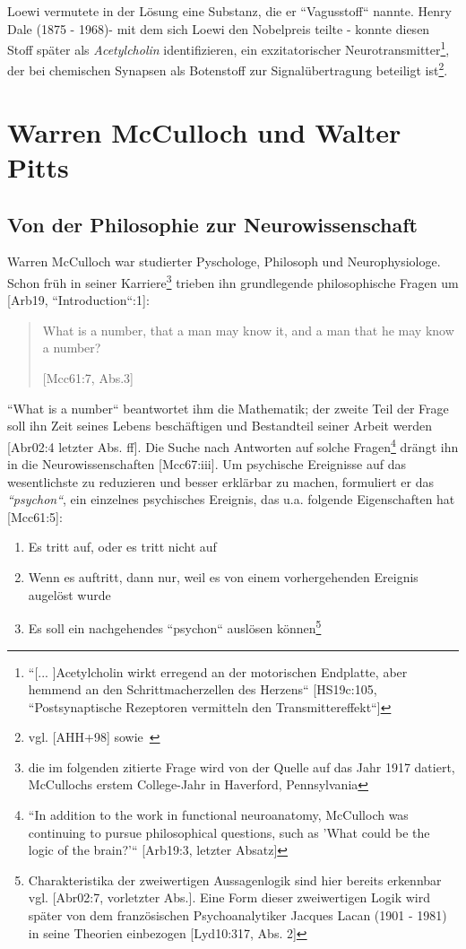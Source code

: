 Loewi vermutete in der Lösung eine Substanz, die er ``Vagusstoff`` nannte.
Henry Dale (1875 - 1968)- mit dem sich Loewi den Nobelpreis teilte - konnte diesen Stoff später als \textit{Acetylcholin} identifizieren, ein exzitatorischer Neurotransmitter\footnote{
    ``[... ]Acetylcholin wirkt erregend an der motorischen Endplatte, aber hemmend an den Schrittmacherzellen des Herzens`` {[HS19c:105, ``Postsynaptische Rezeptoren vermitteln den Transmittereffekt``]}
}, der bei chemischen Synapsen als Botenstoff zur Signalübertragung beteiligt ist\footnote{
    vgl. {[AHH+98]} sowie~\cite[119, Exkurs 5.1]{BCP18}
}.

\section{Warren McCulloch und Walter Pitts}\label{appendix:mcculloch}
\subsection*{Von der Philosophie zur Neurowissenschaft}

Warren McCulloch war studierter Pyschologe, Philosoph und Neurophysiologe.
Schon früh in seiner Karriere\footnote{
    die im folgenden zitierte Frage wird von der Quelle auf das Jahr 1917 datiert, McCullochs erstem College-Jahr in Haverford, Pennsylvania
} trieben ihn grundlegende philosophische Fragen um [Arb19, ``Introduction``:1]:

\blockquote[{[Mcc61:7, Abs.3]}]{
    What is a number, that a man may know it, and a man that he may know a number{?}
}

\noindent
``What is a number`` beantwortet ihm die Mathematik; der zweite Teil der Frage soll ihn Zeit seines Lebens beschäftigen und Bestandteil seiner Arbeit werden [Abr02:4 letzter Abs. ff].
Die Suche nach Antworten auf solche Fragen\footnote{
    ``In addition to the work in functional neuroanatomy, McCulloch was continuing to pursue philosophical questions, such as 'What could be the logic of the brain?'`` [Arb19:3, letzter Absatz]
} drängt ihn in die Neurowissenschaften [Mcc67:iii].
Um psychische Ereignisse auf das wesentlichste zu reduzieren und besser erklärbar zu machen, formuliert er das \textit{``psychon``}, ein einzelnes psychisches Ereignis, das u.a. folgende Eigenschaften hat [Mcc61:5]:

\begin{enumerate}
    \item Es tritt auf, oder es tritt nicht auf
    \item Wenn es auftritt, dann nur, weil es von einem vorhergehenden Ereignis augelöst wurde
    \item Es soll ein nachgehendes ``psychon`` auslösen können\footnote{
        Charakteristika der zweiwertigen Aussagenlogik sind hier bereits erkennbar vgl. [Abr02:7, vorletzter Abs.]. Eine Form dieser zweiwertigen Logik wird später von dem französischen Psychoanalytiker Jacques Lacan (1901 - 1981) in seine Theorien einbezogen [Lyd10:317, Abs. 2]
    }
\end{enumerate}


